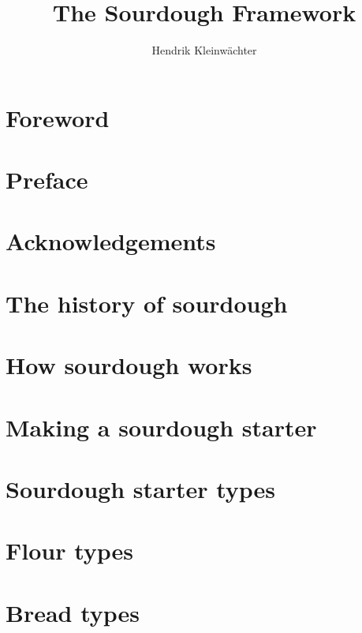 \documentclass[a4paper, twoside, 12pt]{scrbook}
\author{Hendrik Kleinwächter}
\title{The Sourdough Framework}
\begin{document}

\titlepage

\frontmatter
\ifdefined\HCode\else\tableofcontents\fi

\chapter{Foreword}


\chapter{Preface}


\chapter{Acknowledgements}



\mainmatter

\chapter{The history of sourdough}


\chapter{How sourdough works}


\chapter{Making a sourdough starter}


\chapter{Sourdough starter types}


\chapter{Flour types}


\chapter{Bread types}

\end{document}
